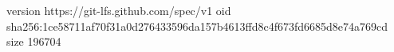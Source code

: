version https://git-lfs.github.com/spec/v1
oid sha256:1ce58711af70f31a0d276433596da157b4613ffd8c4f673fd6685d8e74a769cd
size 196704
